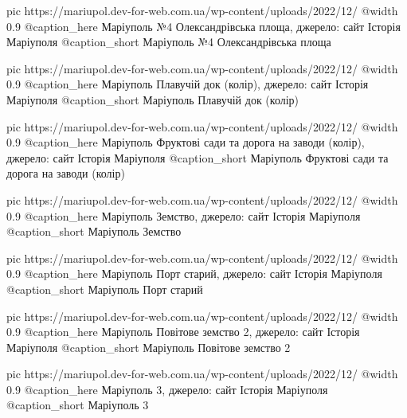   pic https://mariupol.dev-for-web.com.ua/wp-content/uploads/2022/12/%
  @width 0.9
  @caption_here Маріуполь №4 Олександрівська площа, джерело: сайт Історія Маріуполя
  @caption_short Маріуполь №4 Олександрівська площа

  pic https://mariupol.dev-for-web.com.ua/wp-content/uploads/2022/12/%
  @width 0.9
  @caption_here Маріуполь Плавучій док (колір), джерело: сайт Історія Маріуполя
  @caption_short Маріуполь Плавучій док (колір)

  pic https://mariupol.dev-for-web.com.ua/wp-content/uploads/2022/12/%
  @width 0.9
  @caption_here Маріуполь Фруктові сади та дорога на заводи (колір), джерело: сайт Історія Маріуполя
  @caption_short Маріуполь Фруктові сади та дорога на заводи (колір)

  pic https://mariupol.dev-for-web.com.ua/wp-content/uploads/2022/12/%
  @width 0.9
  @caption_here Маріуполь Земство, джерело: сайт Історія Маріуполя
  @caption_short Маріуполь Земство

  pic https://mariupol.dev-for-web.com.ua/wp-content/uploads/2022/12/%
  @width 0.9
  @caption_here Маріуполь Порт старий, джерело: сайт Історія Маріуполя
  @caption_short Маріуполь Порт старий

  pic https://mariupol.dev-for-web.com.ua/wp-content/uploads/2022/12/%
  @width 0.9
  @caption_here Маріуполь Повітове земство 2, джерело: сайт Історія Маріуполя
  @caption_short Маріуполь Повітове земство 2

  pic https://mariupol.dev-for-web.com.ua/wp-content/uploads/2022/12/%
  @width 0.9
  @caption_here Маріуполь 3, джерело: сайт Історія Маріуполя
  @caption_short Маріуполь 3

